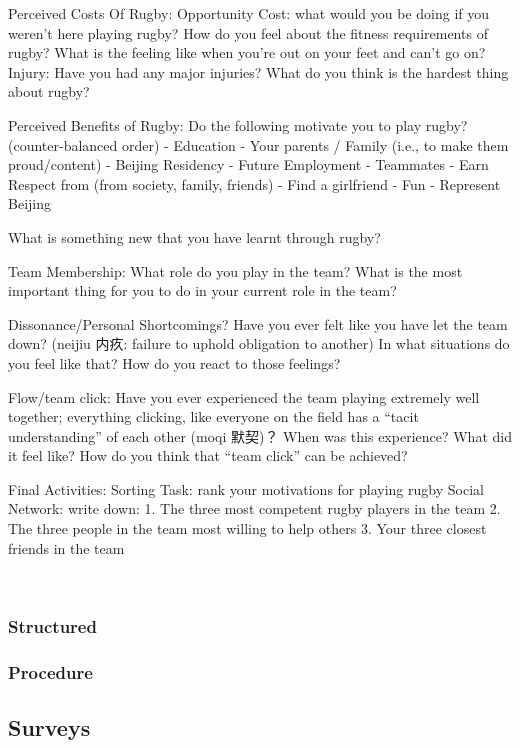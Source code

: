 Perceived Costs Of Rugby:
Opportunity Cost: what would you be doing if you weren’t here playing rugby?
How do you feel about the fitness requirements of rugby?
What is the feeling like when you’re out on your feet and can’t go on?
Injury: Have you had any major injuries?
What do you think is the hardest thing about rugby?

Perceived Benefits of Rugby:
Do the following motivate you to play rugby? (counter-balanced order)
- Education
- Your parents / Family (i.e., to make them proud/content)
- Beijing Residency
- Future Employment
- Teammates
- Earn Respect from (from society, family, friends)
- Find a girlfriend
- Fun
- Represent Beijing

What is something new that you have learnt through rugby?

Team Membership:
What role do you play in the team?
What is the most important thing for you to do in your current role in the team?

Dissonance/Personal Shortcomings?
Have you ever felt like you have let the team down?  (neijiu 内疚: failure to uphold obligation to another)
In what situations do you feel like that?
How do you react to those feelings?

Flow/team click:
Have you ever experienced the team playing extremely well together; everything clicking, like everyone on the field has a “tacit understanding” of each other (moqi 默契)？
When was this experience?
What did it feel like?
How do you think that “team click” can be achieved?

Final Activities:
Sorting Task: rank your motivations for playing rugby
Social Network: write down:
1.	The three most competent rugby players in the team
2.	The three people in the team most willing to help others
3.	Your three closest friends in the team

 

    \subsubsection{Structured}
    \subsubsection{Procedure}



  \subsection{Surveys}

